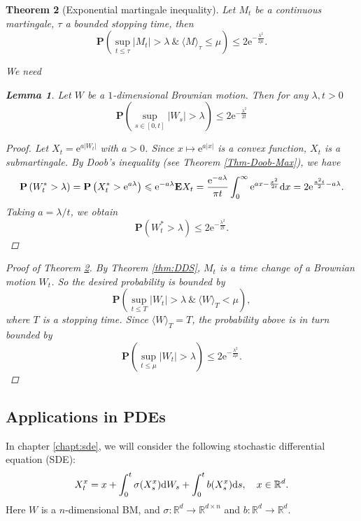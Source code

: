 \documentclass[twoside, 12pt]{book}
\numberwithin{equation}{chapter}
\newtheorem{theorem}{Theorem}[section]
\newtheorem{lemma}[theorem]{Lemma}
\def\mR{{\mathbb R}}
\def\bE{{\mathbf E}}
\def\bP{{\mathbf P}}
\def\l{\left}
\def\r{\right}
\def\<{\langle}
\def\>{\rangle}
\def\leq{\leqslant}
\def\d{\text{\rm{d}}}
\def\e{\mathrm{e}}
\begin{document}
 \begin{theorem}[Exponential martingale inequality]\label{thm:EMI}
     Let $M_t$ be a continuous martingale, $\tau$ a bounded stopping time, then
     \[
     \bP\left(\sup_{t\leq \tau} |M_t|>\lambda~ \&~ \<M\>_\tau\leq\mu\right)\leq 2\e^{-\frac{\lambda^2}{2\mu}}.
     \]
     
     We need 
     \begin{lemma}\label{lem:BM_P1}
		Let $W$ be a $1$-dimensional Brownian motion. Then for any $\lambda, t>0$ 
		\begin{equation*}
			\bP \l(\sup_{s\in [0,t]}|W_s|> \lambda\r) \leq 2\e^{-\frac{\lambda^2}{2t}}
		\end{equation*}
	\end{lemma}
	\begin{proof}
		Let $X_t= \e^{a|W_t|}$ with $a>0$. Since $x\mapsto \e^{a|x|}$ is a convex function, $X_t$ is a submartingale. By Doob's inequality (see Theorem \ref{Thm-Doob-Max}), we have 
		\begin{align*}
			\bP \l(W^*_t>\lambda \r)= \bP \l(X^*_t>\e^{a\lambda}\r)\leq \e^{-a\lambda} \bE X_t = \frac{\e^{-a \lambda} }{\pi t} \int_{0}^\infty \e^{a x-\frac{x^2}{2t}} \d x = 2\e^{\frac{a^2 t}{2}-a\lambda}.
		\end{align*}
		Taking $a=\lambda/t$, we obtain 
		\[
		    \bP \l(W^*_t>\lambda \r) \leq 2 \e^{-\frac{\lambda^2}{2t}}. 
		\]
	\end{proof}
     \begin{proof}[Proof of Theorem \ref{thm:EMI}]
         By Theorem \ref{thm:DDS}, $M_t$ is a time change of a Brownian motion $W_t$. So the desired probability is bounded by 
         \[
             \bP\left(\sup_{t\leq T} |W_t|>\lambda~ \&~ \<W\>_T<\mu\right),
         \]
         where $T$ is a stopping time. Since $\<W\>_T=T$, the probability above is in turn bounded by
         \[
             \bP\left(\sup_{t\leq \mu} |W_t|>\lambda\right)\leq 2\e^{-\frac{\lambda^2}{2\mu}}. 
         \]
     \end{proof}

 \end{theorem}
	
	\subsection{Applications in PDEs}
	In chapter \ref{chapt:sde}, we will consider the following stochastic differential equation (SDE): 
	\[
	   X_t^x=x+\int_0^t \sigma(X^x_s) \d W_s+ \int_0^t b(X^x_s) \d s, \quad x\in \mR^d.
	\]
    Here $W$ is a $n$-dimensional BM, and $\sigma: \mR^d \to \mR^{d\times n}$ and $b:\mR^d\to \mR^d$. 
    
\end{document}
